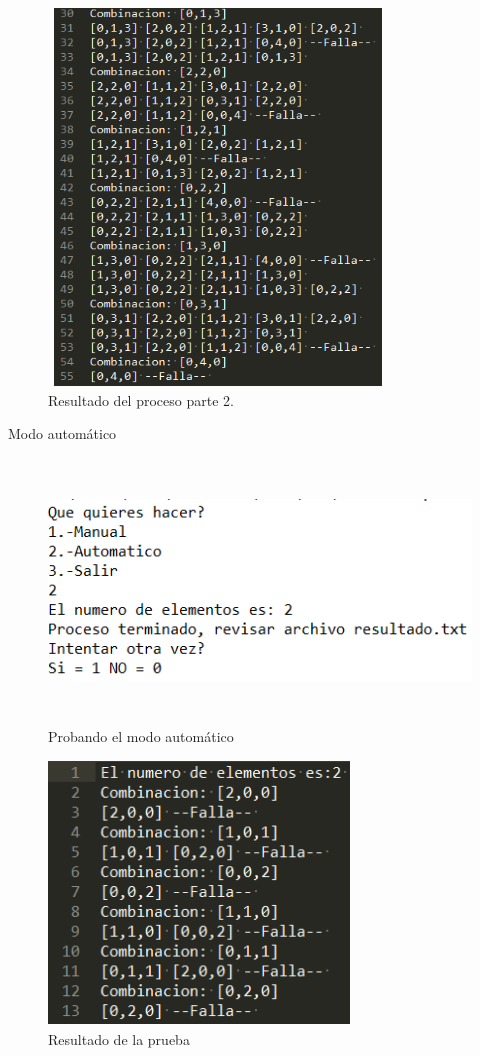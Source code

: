 \begin{figure}[H]
	\begin{center}
		\includegraphics[width=9cm, height=10cm]{img/marcianos-manual-archivo2.png}
		\caption{Resultado del proceso parte 2.}
		\label{fig:marcianos2b}
	\end{center}
\end{figure}
	{\large Modo automático}
	\begin{figure}[H]
		\begin{center}
			\includegraphics[width=\linewidth, height=7cm]{img/marcianos-automatico-consola.png}
			\caption{Probando el modo automático}
			\label{fig:marcianos3}
		\end{center}
	\end{figure}
	\begin{figure}[H]
		\begin{center}
			\includegraphics[width=8cm, height=7cm]{img/marcianos-automatico-archivo.png}
			\caption{Resultado de la prueba}
			\label{fig:marcianos4}
		\end{center}
	\end{figure}
